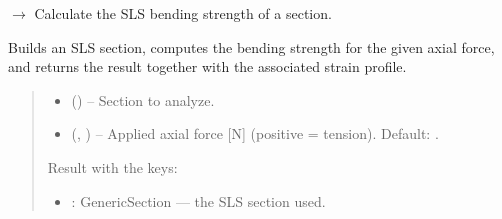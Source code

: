 \documentclass[a4paper,11pt,german]{sphinxmanual}
\begin{document}

\begin{fulllineitems}
\label{\detokenize{api/analysis_core:core.analysis_core.section_methods.calculate_bending_strength_sls_Nmm_EC}}
\pysigstartsignatures
\pysiglinewithargsret
{}
{\sphinxparamcomma {}}
{{ $\rightarrow$ }}
\pysigstopsignatures
\sphinxAtStartPar
Calculate the SLS bending strength of a section.

\sphinxAtStartPar
Builds an SLS section, computes the bending strength for the given
axial force, and returns the result together with the associated
strain profile.
\begin{quote}\begin{description}
\begin{itemize}
\item {} 
\sphinxAtStartPar
{} () – Section to analyze.

\item {} 
\sphinxAtStartPar
{} (, ) – Applied axial force {[}N{]} (positive = tension). Default: .

\end{itemize}

\sphinxAtStartPar

\sphinxAtStartPar
Result with the keys:
\begin{itemize}
\item {} 
\sphinxAtStartPar
{} : GenericSection — the SLS section used.


\end{itemize}
\end{description}
\end{quote}
\end{fulllineitems}
\end{document}
